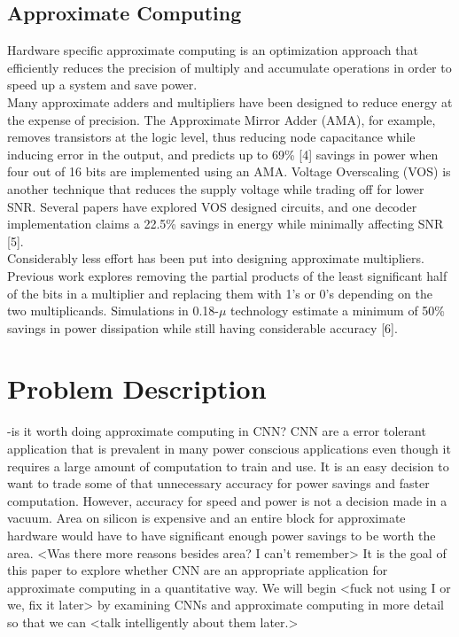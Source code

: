 \documentclass[conference]{IEEEtran}
\begin{document}
\subsection{Approximate Computing}
	Hardware specific approximate computing is an optimization approach that efficiently reduces the precision of multiply and accumulate operations in order to speed up a system and save power. \\
	\indent Many approximate adders and multipliers have been designed to reduce energy at the expense of precision. The Approximate Mirror Adder (AMA), for example, removes transistors at the logic level, thus reducing node capacitance while inducing error in the output, and predicts up to 69\% [4] savings in power when four out of 16 bits are implemented using an AMA. Voltage Overscaling (VOS) is another technique that reduces the supply voltage while trading off for lower SNR. Several papers have explored VOS designed circuits, and one decoder implementation claims a 22.5\% savings in energy while minimally affecting SNR [5]. \\
	\indent Considerably less effort has been put into designing approximate multipliers. Previous work explores removing the partial products of the least significant half of the bits in a multiplier and replacing them with 1's or 0's depending on the two multiplicands. Simulations in 0.18-$\mu$ technology estimate a minimum of 50\% savings in power dissipation while still having considerable accuracy [6].


\section{Problem Description}
-is it worth doing approximate computing in CNN?
CNN are a error tolerant application that is prevalent in many power conscious applications even though it requires a large amount of computation to train and use. It is an easy decision to want to trade some of that unnecessary accuracy for power savings and faster computation. However, accuracy for speed and power is not a decision made in a vacuum. Area on silicon is expensive and an entire block for approximate hardware would have to have significant enough power savings to be worth the area. <Was there more reasons besides area? I can't remember> It is the goal of this paper to explore whether CNN are an appropriate application for approximate computing in a quantitative way. We will begin <fuck not using I or we, fix it later> by examining CNNs and approximate computing in more detail so that we can <talk intelligently about them later.>
\end{document}
